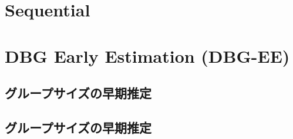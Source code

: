 \section{Sequential}
\section{DBG Early Estimation (DBG-EE)}
\subsection{グループサイズの早期推定}
\subsection{グループサイズの早期推定}